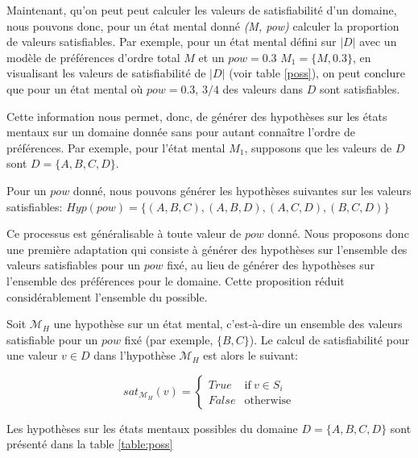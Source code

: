 \documentclass{llncs}
\begin{document}
	Maintenant, qu'on peut peut calculer les valeurs de satisfiabilité d'un domaine, nous pouvons donc, pour un état mental donné \emph{(M, pow)} calculer la proportion de valeurs satisfiables. 
	Par exemple, pour un état mental défini sur $|D|$ avec un modèle de préférences d'ordre total $M$ et un $pow =0.3$ $M_1 = \{M, 0.3\}$, en visualisant les valeurs de satisfiabilité de $|D|$ (voir table \ref{poss}), on peut conclure que pour un état mental où $pow =0.3$, $3/4$ des valeurs dans $D$ sont satisfiables. 
	
	Cette information nous permet, donc, de générer des hypothèses sur les états mentaux sur un domaine donnée sans pour autant connaître l'ordre de préférences.
	Par exemple, pour l'état mental $M_1$,  supposons que les valeurs de $D$ sont $D =\{A, B, C, D\}$.
	
	Pour un $pow$ donné, nous pouvons générer les hypothèses suivantes sur les valeurs satisfiables: 
	$Hyp(pow) = \{(A,B,C) , (A,B,D), (A,C,D), (B,C,D) \}$
	
	Ce processus est généralisable à toute valeur de $pow$ donné. Nous proposons donc une première adaptation qui consiste à générer des hypothèses sur l'ensemble des valeurs satisfiables pour un $pow$ fixé, au lieu de générer des hypothèses sur l'ensemble des préférences pour le domaine. Cette proposition réduit considérablement l'ensemble du possible.
	
	Soit $\mathcal{M}_H$ une hypothèse sur un état mental, c'est-à-dire un ensemble des valeurs satisfiable pour un $pow$ fixé (par exemple, $\{B,C\}$). Le calcul de satisfiabilité pour une valeur $v\in D$ dans l'hypothèse $\mathcal{M}_H$ est alors le suivant: 
	
		\begin{equation}
		sat_{\mathcal{M}_H}(v)= \left\{\begin{array}{ll}
		True	 & \mathrm{if\ }  v \in S_i\\
		False & \mathrm{otherwise}
		\end{array}\right.
		\end{equation}
		
	Les hypothèses sur les états mentaux possibles du domaine $D =\{A, B, C, D\}$ sont présenté dans la table \ref{table:poss} 
	
\end{document}
